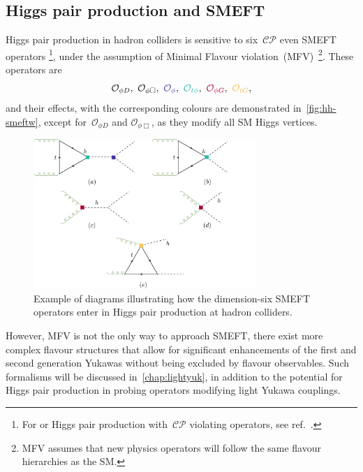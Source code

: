 \subsection{Higgs pair production and SMEFT}
Higgs pair production in hadron colliders is sensitive to six~$\mathcal{CP}$ even SMEFT operators \footnote{For or Higgs pair production with~$\mathcal{CP}$ violating operators, see ref.~\cite{Grober:2017gut}. }, under the assumption of Minimal Flavour violation~(MFV)~\footnote{MFV assumes that new physics operators will follow the same flavour hierarchies as the SM. }. These operators are
\begin{equation}
	\mathcal{O}_{\phi D},\ \mathcal{O}_{\phi \Box},\ \textcolor[HTML]{4334a0}{\mathcal{O}_{\phi}}, \ 	\textcolor[HTML]{2ebbaa}{\mathcal{O}_{t\phi}}, \ 	\textcolor[HTML]{ae0034}{\mathcal{O}_{\phi G}},\ \textcolor[HTML]{ffb743}{\mathcal{O}_{t G}},
	\label{HH-smeft}
\end{equation}
and their effects, with the corresponding colours are demonstrated in~\autoref{fig:hh-smeftw}, except for~$\mathcal{O}_{\phi D}$ and  $\mathcal{O}_{\phi \Box}$, as they modify all SM Higgs vertices. 
\begin{figure}[t!]
	\begin{center}
		\includegraphics[width=0.75\textwidth]{figures/hh-smeft}
		\caption{ Example of diagrams illustrating how the dimension-six SMEFT operators enter in Higgs pair production at hadron colliders. \label{fig:hh-smeftw} }
	\end{center}
\end{figure}
However, MFV is not the only way to approach SMEFT, there exist more complex flavour structures that allow for significant enhancements of the first and second generation Yukawas without being excluded by flavour observables. Such formalisms will be discussed in~\autoref{chap:lightyuk}, in addition to  the potential for Higgs pair production in probing operators modifying light Yukawa couplings. 
